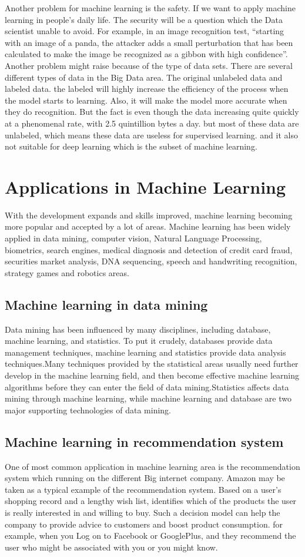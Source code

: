\documentclass[sigconf]{acmart}
\begin{document}
Another problem for machine learning is the safety. If we want to apply machine learning in people’s daily life. The security will be a question which the Data scientist unable to avoid. For example, in an image recognition test, ``starting with an image of a panda, the attacker adds a small perturbation that has been calculated to make the image be recognized as a gibbon with high confidence''\cite{Ophir}.
Another problem might raise because of the type of data sets. There are several different types of data in the Big Data area. The original unlabeled data and labeled data. the labeled will highly increase the efficiency of the process when the model starts to learning. Also, it will make the model more accurate when they do recognition. But the fact is even though the data increasing quite quickly at a phenomenal rate, with 2.5 quintillion bytes a day. but most of these data are unlabeled, which means these data are useless for supervised learning. and it also not suitable for deep learning which is the subset of machine learning.
\section{Applications in Machine Learning}
With the development expands and skills improved, machine learning becoming more popular and accepted by a lot of areas. Machine learning has been widely applied in data mining, computer vision, Natural Language Processing, biometrics, search engines, medical diagnosis and detection of credit card fraud, securities market analysis, DNA sequencing, speech and handwriting recognition, strategy games and robotics areas.
\subsection{Machine learning in data mining}
Data mining has been influenced by many disciplines, including database, machine learning, and statistics. To put it crudely, databases provide data management techniques, machine learning and statistics provide data analysis techniques.Many techniques provided by the statistical areas usually need further develop in the machine learning field, and then become effective machine learning algorithms before they can enter the field of data mining\cite{Margaret01}.Statistics affects data mining through machine learning, while machine learning and database are two major supporting technologies of data mining.
\subsection{Machine learning in recommendation system}
One of most common application in machine learning area is the recommendation system which running on the different Big internet company. Amazon may be taken as a typical example of the recommendation system. Based on a user's shopping record and a lengthy wish list, identifies which of the products the user is really interested in and willing to buy. Such a decision model can help the company to provide advice to customers and boost product consumption. for example, when you Log on to Facebook or GooglePlus, and they recommend the user who might be associated with you or you might know\cite{Bernard01}.
\end{document}
